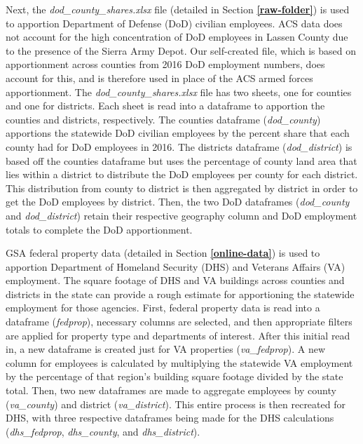\documentclass[
]{book}
\begin{document}
Next, the \emph{dod\_county\_shares.xlsx} file (detailed in Section \textbf{\ref{raw-folder}}) is used to apportion Department of Defense (DoD) civilian employees. ACS data does not account for the high concentration of DoD employees in Lassen County due to the presence of the Sierra Army Depot. Our self-created file, which is based on apportionment across counties from 2016 DoD employment numbers, does account for this, and is therefore used in place of the ACS armed forces apportionment. The \emph{dod\_county\_shares.xlsx} file has two sheets, one for counties and one for districts. Each sheet is read into a dataframe to apportion the counties and districts, respectively. The counties dataframe (\emph{dod\_county}) apportions the statewide DoD civilian employees by the percent share that each county had for DoD employees in 2016. The districts dataframe (\emph{dod\_district}) is based off the counties dataframe but uses the percentage of county land area that lies within a district to distribute the DoD employees per county for each district. This distribution from county to district is then aggregated by district in order to get the DoD employees by district. Then, the two DoD dataframes (\emph{dod\_county} and \emph{dod\_district}) retain their respective geography column and DoD employment totals to complete the DoD apportionment.

GSA federal property data (detailed in Section \textbf{\ref{online-data}}) is used to apportion Department of Homeland Security (DHS) and Veterans Affairs (VA) employment. The square footage of DHS and VA buildings across counties and districts in the state can provide a rough estimate for apportioning the statewide employment for those agencies. First, federal property data is read into a dataframe (\emph{fedprop}), necessary columns are selected, and then appropriate filters are applied for property type and departments of interest. After this initial read in, a new dataframe is created just for VA properties (\emph{va\_fedprop}). A new column for employees is calculated by multiplying the statewide VA employment by the percentage of that region's building square footage divided by the state total. Then, two new dataframes are made to aggregate employees by county (\emph{va\_county}) and district (\emph{va\_district}). This entire process is then recreated for DHS, with three respective dataframes being made for the DHS calculations (\emph{dhs\_fedprop}, \emph{dhs\_county}, and \emph{dhs\_district}).
\end{document}
